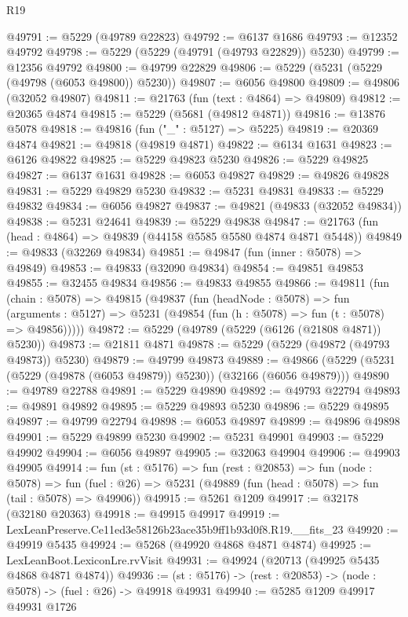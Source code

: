 \begin{lexlean}{R19}
\begin{coremodule}
@49791 := @5229 (@49789 @22823)
@49792 := @6137 @1686
@49793 := @12352 @49792
@49798 := @5229 (@5229 (@49791 (@49793 @22829)) @5230)
@49799 := @12356 @49792
@49800 := @49799 @22829
@49806 := @5229 (@5231 (@5229 (@49798 (@6053 @49800)) @5230))
@49807 := @6056 @49800
@49809 := @49806 (@32052 @49807)
@49811 := @21763 (fun (text : @4864) => @49809)
@49812 := @20365 @4874
@49815 := @5229 (@5681 (@49812 @4871))
@49816 := @13876 @5078
@49818 := @49816 (fun ("_" : @5127) => @5225)
@49819 := @20369 @4874
@49821 := @49818 (@49819 @4871)
@49822 := @6134 @1631
@49823 := @6126 @49822
@49825 := @5229 @49823 @5230
@49826 := @5229 @49825
@49827 := @6137 @1631
@49828 := @6053 @49827
@49829 := @49826 @49828
@49831 := @5229 @49829 @5230
@49832 := @5231 @49831
@49833 := @5229 @49832
@49834 := @6056 @49827
@49837 := @49821 (@49833 (@32052 @49834))
@49838 := @5231 @24641
@49839 := @5229 @49838
@49847 := @21763 (fun (head : @4864) => @49839 (@44158 @5585 @5580 @4874 @4871 @5448))
@49849 := @49833 (@32269 @49834)
@49851 := @49847 (fun (inner : @5078) => @49849)
@49853 := @49833 (@32090 @49834)
@49854 := @49851 @49853
@49855 := @32455 @49834
@49856 := @49833 @49855
@49866 := @49811
    (fun (chain : @5078) =>
    @49815
      (@49837
        (fun (headNode : @5078) =>
        fun (arguments : @5127) => @5231 (@49854 (fun (h : @5078) => fun (t : @5078) => @49856)))))
@49872 := @5229 (@49789 (@5229 (@6126 (@21808 @4871)) @5230))
@49873 := @21811 @4871
@49878 := @5229 (@5229 (@49872 (@49793 @49873)) @5230)
@49879 := @49799 @49873
@49889 := @49866 (@5229 (@5231 (@5229 (@49878 (@6053 @49879)) @5230)) (@32166 (@6056 @49879)))
@49890 := @49789 @22788
@49891 := @5229 @49890
@49892 := @49793 @22794
@49893 := @49891 @49892
@49895 := @5229 @49893 @5230
@49896 := @5229 @49895
@49897 := @49799 @22794
@49898 := @6053 @49897
@49899 := @49896 @49898
@49901 := @5229 @49899 @5230
@49902 := @5231 @49901
@49903 := @5229 @49902
@49904 := @6056 @49897
@49905 := @32063 @49904
@49906 := @49903 @49905
@49914 := fun (st : @5176) =>
  fun (rest : @20853) =>
  fun (node : @5078) =>
  fun (fuel : @26) => @5231 (@49889 (fun (head : @5078) => fun (tail : @5078) => @49906))
@49915 := @5261 @1209
@49917 := @32178 (@32180 @20363)
@49918 := @49915 @49917
@49919 := LexLeanPreserve.Ce11ed3e58126b23ace35b9ff1b93d0f8.R19.__fits_23
@49920 := @49919 @5435
@49924 := @5268 (@49920 @4868 @4871 @4874)
@49925 := LexLeanBoot.LexiconLre.rvVisit
@49931 := @49924 (@20713 (@49925 @5435 @4868 @4871 @4874))
@49936 := (st : @5176) -> (rest : @20853) -> (node : @5078) -> (fuel : @26) -> @49918 @49931
@49940 := @5285 @1209 @49917 @49931 @1726

\end{coremodule}
\end{lexlean}
